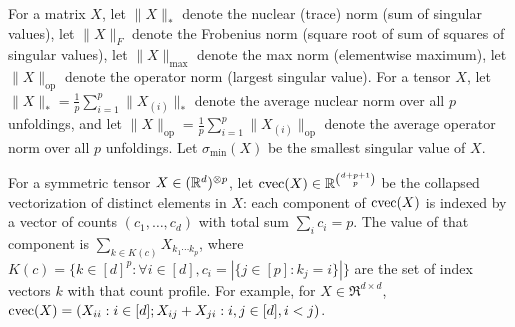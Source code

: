 For a matrix $X$,
let $\|X\|_*$ denote the nuclear (trace) norm (sum of singular values),
let $\|X\|_F$ denote the Frobenius norm (square root of sum of squares of singular values),
let $\|X\|_{\max}$ denote the max norm (elementwise maximum),
let $\|X\|_\text{op}$ denote the operator norm (largest singular value).
For a tensor $X$,
let $\|X\|_* = \frac{1}{p} \sum_{i=1}^p \|X_{(i)}\|_*$ denote
the average nuclear norm over all $p$ unfoldings,
and let $\|X\|_\text{op} = \frac{1}{p} \sum_{i=1}^p \|X_{(i)}\|_\text{op}$
denote the average operator norm over all $p$ unfoldings.
Let $\sigma_\text{min}(X)$ be the smallest singular value of $X$.

For a symmetric tensor $X \in (\mathbb{R}^d)^{\otimes p}$, let $\operatorname{cvec}(X) \in
\mathbb{R}^{\binom{d + p + 1}{p}}$ be the collapsed vectorization of distinct
elements in $X$: each component of $\operatorname{cvec}(X)$ is indexed by a vector of
counts $(c_1, \dots, c_d)$ with total sum $\sum_i c_i = p$.  The value
of that component is $\sum_{k \in K(c)} X_{k_1 \cdots k_p}$, where $K(c)
= \{ k \in [d]^p : \forall i \in [d], c_i = |\{ j \in [p] : k_j = i \}|
\}$ are the set of index vectors $k$ with that count profile.  For
example, for $X \in \Re^{d \times d}$, $\operatorname{cvec}(X) = (X_{ii} : i \in [d];
X_{ij} + X_{ji} : i,j \in [d], i<j)$.
